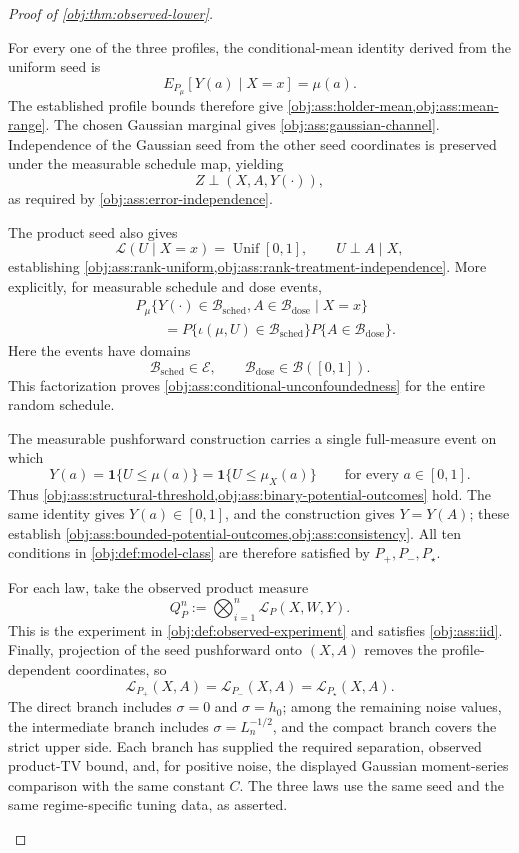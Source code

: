 \documentclass[11pt]{article}
\begin{document}
\begin{proof}[Proof of \cref{obj:thm:observed-lower}]
\begin{enumerate}
For every one of the three profiles, the conditional-mean identity derived from the uniform seed is
\[
E_{P_\mu}[Y(a)\mid X=x]=\mu(a).
\]
The established profile bounds therefore give
\cref{obj:ass:holder-mean,obj:ass:mean-range}. The chosen Gaussian marginal gives \cref{obj:ass:gaussian-channel}. Independence of the Gaussian seed from the other seed coordinates is preserved under the measurable schedule map, yielding
\[
Z\perp(X,A,Y(\cdot)),
\]
as required by \cref{obj:ass:error-independence}.

The product seed also gives
\[
\mathcal L(U\mid X=x)=\operatorname{Unif}[0,1],
\qquad U\perp A\mid X,
\]
establishing \cref{obj:ass:rank-uniform,obj:ass:rank-treatment-independence}. More explicitly, for measurable schedule and dose events,
\[
\begin{aligned}
&P_\mu\{Y(\cdot)\in\mathcal B_{\mathrm{sched}},
A\in\mathcal B_{\mathrm{dose}}\mid X=x\}\\
&\qquad=
P\{\iota(\mu,U)\in\mathcal B_{\mathrm{sched}}\}
P\{A\in\mathcal B_{\mathrm{dose}}\}.
\end{aligned}
\]
Here the events have domains
\[
\mathcal B_{\mathrm{sched}}\in\mathcal E,\qquad
\mathcal B_{\mathrm{dose}}\in\mathcal B([0,1]).
\]
This factorization proves \cref{obj:ass:conditional-unconfoundedness} for the entire random schedule.

The measurable pushforward construction carries a single full-measure event on which
\[
Y(a)=\mathbf1\{U\le\mu(a)\}
=\mathbf1\{U\le\mu_X(a)\}
\qquad\text{for every }a\in[0,1].
\]
Thus \cref{obj:ass:structural-threshold,obj:ass:binary-potential-outcomes} hold. The same identity gives \(Y(a)\in[0,1]\), and the construction gives \(Y=Y(A)\); these establish \cref{obj:ass:bounded-potential-outcomes,obj:ass:consistency}. All ten conditions in \cref{obj:def:model-class} are therefore satisfied by \(P_+,P_-,P_\star\).

For each law, take the observed product measure
\[
Q_P^n:=\bigotimes_{i=1}^n\mathcal L_P(X,W,Y).
\]
This is the experiment in \cref{obj:def:observed-experiment} and satisfies \cref{obj:ass:iid}. Finally, projection of the seed pushforward onto \((X,A)\) removes the profile-dependent coordinates, so
\[
\mathcal L_{P_+}(X,A)
=\mathcal L_{P_-}(X,A)
=\mathcal L_{P_\star}(X,A).
\]
The direct branch includes \(\sigma=0\) and \(\sigma=h_0\); among the remaining noise values, the intermediate branch includes \(\sigma=L_n^{-1/2}\), and the compact branch covers the strict upper side. Each branch has supplied the required separation, observed product-TV bound, and, for positive noise, the displayed Gaussian moment-series comparison with the same constant \(C\). The three laws use the same seed and the same regime-specific tuning data, as asserted.
\end{enumerate}
\end{proof}




\end{document}
